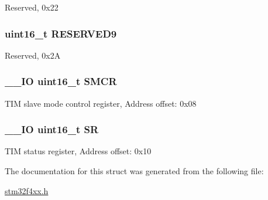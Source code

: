 Reserved, 0x22 \hypertarget{struct_t_i_m___type_def_ad8b1fadb520f7a200ee0046e110edc79}{
\subsubsection[{R\-E\-S\-E\-R\-V\-E\-D9}]{\setlength{\rightskip}{0pt plus 5cm}uint16\-\_\-t R\-E\-S\-E\-R\-V\-E\-D9}}\label{struct_t_i_m___type_def_ad8b1fadb520f7a200ee0046e110edc79}
Reserved, 0x2\-A \hypertarget{struct_t_i_m___type_def_a02758713abfe580460dd5bcd8762702a}{
\subsubsection[{S\-M\-C\-R}]{\setlength{\rightskip}{0pt plus 5cm}\-\_\-\-\_\-\-I\-O uint16\-\_\-t S\-M\-C\-R}}\label{struct_t_i_m___type_def_a02758713abfe580460dd5bcd8762702a}
T\-I\-M slave mode control register, Address offset\-: 0x08 \hypertarget{struct_t_i_m___type_def_a44962ea5442d203bf4954035d1bfeb9d}{
\subsubsection[{S\-R}]{\setlength{\rightskip}{0pt plus 5cm}\-\_\-\-\_\-\-I\-O uint16\-\_\-t S\-R}}\label{struct_t_i_m___type_def_a44962ea5442d203bf4954035d1bfeb9d}
T\-I\-M status register, Address offset\-: 0x10 

The documentation for this struct was generated from the following file\-:\begin{DoxyCompactItemize}
\item 
\hyperlink{stm32f4xx_8h}{stm32f4xx.\-h}\end{DoxyCompactItemize}
